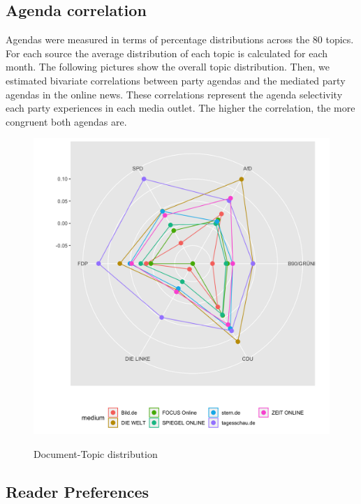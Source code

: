 \documentclass[12pt,a4paper,notitlepage]{article}
\begin{document}
\subsection{Agenda correlation}

Agendas were measured in terms of percentage distributions across the 80 topics. For each source the average distribution of each topic is calculated for each month. The following pictures show the overall topic distribution. Then, we estimated bivariate correlations between party agendas and the mediated party agendas in the online news. These correlations represent the agenda selectivity each party experiences in each media outlet. The higher the correlation, the more congruent both agendas are. 

\begin{figure}[H]
\begin{center}
	\caption{Document-Topic distribution}
	\includegraphics[width=\textwidth]{../figs/radarchart}
	\label{fig_expected_freq}
	\end{center}
\end{figure}

\subsection{Reader Preferences}\label{ch_readerpref}
\end{document}
